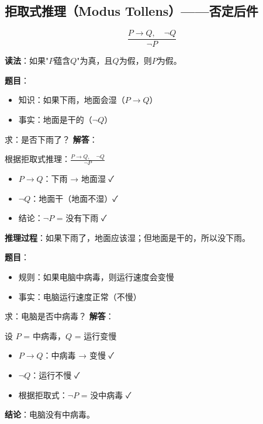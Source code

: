 \subsection{拒取式推理（Modus Tollens）——否定后件}
\begin{formulabox}
$$\frac{P \to Q, \quad \neg Q}{\neg P}$$

\textbf{读法}：如果"$P$蕴含$Q$"为真，且$Q$为假，则$P$为假。
\end{formulabox}

\begin{examplebox}[例题3.3 拒取式推理应用]
\textbf{题目}：
\begin{itemize}[itemsep=0pt]
    \item 知识：如果下雨，地面会湿（$P \to Q$）
    \item 事实：地面是干的（$\neg Q$）
\end{itemize}
求：是否下雨了？
\tcblower
\textbf{解答}：

根据拒取式推理：$\frac{P \to Q, \quad \neg Q}{\neg P}$

\begin{itemize}[itemsep=0pt]
    \item $P \to Q$：下雨 → 地面湿 ✓
    \item $\neg Q$：地面干（地面不湿）✓
    \item 结论：$\neg P$ = 没有下雨 ✓
\end{itemize}

\textbf{推理过程}：如果下雨了，地面应该湿；但地面是干的，所以没下雨。
\end{examplebox}

\begin{examplebox}
\textbf{题目}：
\begin{itemize}[itemsep=0pt]
    \item 规则：如果电脑中病毒，则运行速度会变慢
    \item 事实：电脑运行速度正常（不慢）
\end{itemize}
求：电脑是否中病毒？
\tcblower
\textbf{解答}：

设 $P$ = 中病毒，$Q$ = 运行变慢

\begin{itemize}[itemsep=0pt]
    \item $P \to Q$：中病毒 → 变慢 ✓
    \item $\neg Q$：运行不慢 ✓
    \item 根据拒取式：$\neg P$ = 没中病毒 ✓
\end{itemize}

\textbf{结论}：电脑没有中病毒。
\end{examplebox}

